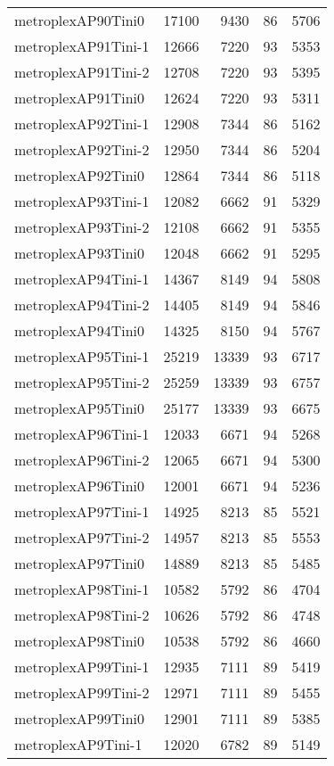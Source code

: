 \begin{longtable}{lrrrr}
metroplexAP90Tini0 & 17100 & 9430 & 86 & 5706 \\
metroplexAP91Tini-1 & 12666 & 7220 & 93 & 5353 \\
metroplexAP91Tini-2 & 12708 & 7220 & 93 & 5395 \\
metroplexAP91Tini0 & 12624 & 7220 & 93 & 5311 \\
metroplexAP92Tini-1 & 12908 & 7344 & 86 & 5162 \\
metroplexAP92Tini-2 & 12950 & 7344 & 86 & 5204 \\
metroplexAP92Tini0 & 12864 & 7344 & 86 & 5118 \\
metroplexAP93Tini-1 & 12082 & 6662 & 91 & 5329 \\
metroplexAP93Tini-2 & 12108 & 6662 & 91 & 5355 \\
metroplexAP93Tini0 & 12048 & 6662 & 91 & 5295 \\
metroplexAP94Tini-1 & 14367 & 8149 & 94 & 5808 \\
metroplexAP94Tini-2 & 14405 & 8149 & 94 & 5846 \\
metroplexAP94Tini0 & 14325 & 8150 & 94 & 5767 \\
metroplexAP95Tini-1 & 25219 & 13339 & 93 & 6717 \\
metroplexAP95Tini-2 & 25259 & 13339 & 93 & 6757 \\
metroplexAP95Tini0 & 25177 & 13339 & 93 & 6675 \\
metroplexAP96Tini-1 & 12033 & 6671 & 94 & 5268 \\
metroplexAP96Tini-2 & 12065 & 6671 & 94 & 5300 \\
metroplexAP96Tini0 & 12001 & 6671 & 94 & 5236 \\
metroplexAP97Tini-1 & 14925 & 8213 & 85 & 5521 \\
metroplexAP97Tini-2 & 14957 & 8213 & 85 & 5553 \\
metroplexAP97Tini0 & 14889 & 8213 & 85 & 5485 \\
metroplexAP98Tini-1 & 10582 & 5792 & 86 & 4704 \\
metroplexAP98Tini-2 & 10626 & 5792 & 86 & 4748 \\
metroplexAP98Tini0 & 10538 & 5792 & 86 & 4660 \\
metroplexAP99Tini-1 & 12935 & 7111 & 89 & 5419 \\
metroplexAP99Tini-2 & 12971 & 7111 & 89 & 5455 \\
metroplexAP99Tini0 & 12901 & 7111 & 89 & 5385 \\
metroplexAP9Tini-1 & 12020 & 6782 & 89 & 5149 \\

\end{longtable}
